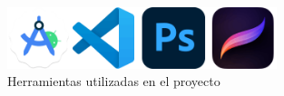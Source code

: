 \begin{figure}[H]
    \centering
    \includegraphics[width=0.7\textwidth]{include/images/herramientas.png}
    \caption{Herramientas utilizadas en el proyecto}
    \label{figure:tools}
\end{figure}
	
\cleardoublepage